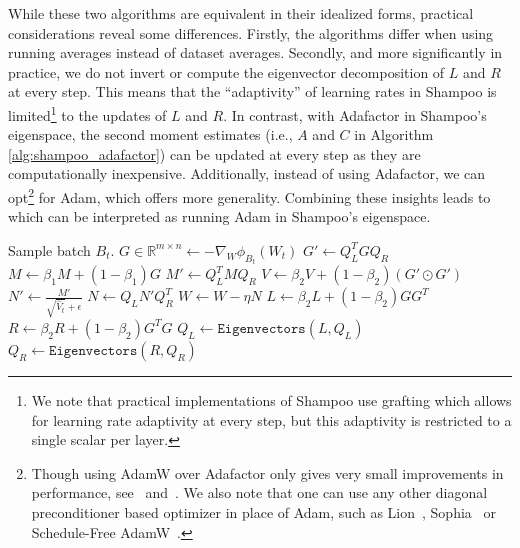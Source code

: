 \documentclass{article}
\def\eps{{\epsilon}}
\begin{document}
While these two algorithms are equivalent in their idealized forms, practical considerations reveal some differences. Firstly, the algorithms differ when using running averages instead of dataset averages.
Secondly, and more significantly in practice, we do not invert or compute the eigenvector decomposition of $L$ and $R$ at every step. This means that the ``adaptivity'' of learning rates in Shampoo is limited\footnote{We note that practical implementations of Shampoo use grafting which allows for learning rate adaptivity at every step, but this adaptivity is restricted to a single scalar per layer.} to the updates of $L$ and $R$. In contrast, with Adafactor in Shampoo's eigenspace, the second moment estimates (i.e., $A$ and $C$ in Algorithm \ref{alg:shampoo_adafactor}) can be updated at every step as they are computationally inexpensive. Additionally, instead of using Adafactor, we can opt\footnote{Though using AdamW over Adafactor only gives very small improvements in performance, see~ and~. We also note that one can use any other diagonal preconditioner based optimizer in place of Adam, such as Lion~\citep{lion}, Sophia~\citep{liu2024sophia} or Schedule-Free AdamW~\citep{schedulefree}.} for Adam, which offers more generality. Combining these insights leads to~ which can be interpreted as running Adam in Shampoo's eigenspace.

\begin{algorithm}[t]
	
	\begin{algorithmic}[1]
		\STATE Sample batch $B_t$.
		\STATE $G \in \mathbb{R}^{m \times n} \gets -\nabla_W \phi_{B_t}(W_t)$
		\STATE $G' \gets Q_L^T G Q_R$
		\STATE $M \gets \beta_1 M + (1-\beta_1) G$
		\STATE $M' \gets Q_L^T M Q_R$
		\STATE {}
		\STATE $V \gets \beta_2 V + (1-\beta_2) (G' \odot G')$ 
		\STATE $N' \gets \frac{M'}{\sqrt{\hat{V}_t} + \epsilon}$ 
		\STATE {}
		\STATE $N \gets Q_L N' Q_R^T$ 
		\STATE $W \gets W - \eta N$
		\STATE {}
		\STATE $L \gets \beta_2  L + (1-\beta_2) GG^T$
		\STATE $R \gets \beta_2  R + (1-\beta_2) G^TG$
		\STATE $Q_L \gets \texttt{Eigenvectors}(L, Q_L)$
		\STATE $Q_R \gets \texttt{Eigenvectors}(R, Q_R)$
		\ENDIF
	\end{algorithmic}
	\caption{Single step of SOAP for a $m \times n$ layer. Per layer, we  maintain four matrices: $L \in \mathbb{R}^{m \times m}, R \in \mathbb{R}^{n \times n}$ and $V, M \in \mathbb{R}^{m \times n}$. For simplicity we  ignore the initialization and other boundary effects such as bias correction. Hyperparameters: Learning rate $\eta$, $\text{betas} = (\beta_1, \beta_2)$, epsilon $\eps$, and preconditioning frequency $f$.\\ An implementation of SOAP is available at \url{https://github.com/nikhilvyas/SOAP/tree/main}.}
	\label{alg:SOAP}
\end{algorithm}
\end{document}
